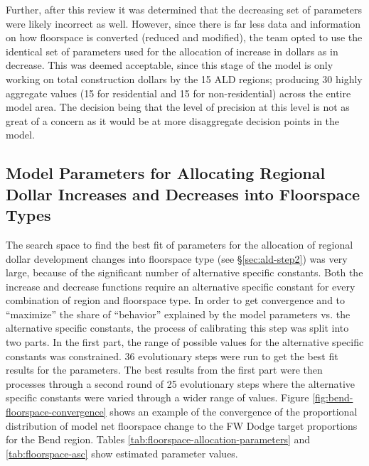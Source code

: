 Further, after this review it was determined that the decreasing set of parameters were likely incorrect as well. However, since there is far less data and information on how floorspace is converted (reduced and modified), the team opted to use the identical set of parameters used for the allocation of increase in dollars as in decrease. This was deemed acceptable, since this stage of the model is only working on total construction dollars by the 15 ALD regions; producing 30 highly aggregate values (15 for residential and 15 for non-residential) across the entire model area. The decision being that the level of precision at this level is not as great of a concern as it would be at more disaggregate decision points in the model.
  

\subsection{Model Parameters for Allocating Regional Dollar Increases and Decreases into Floorspace Types}\label{sec:ald-allocate-inc-dec}   %
The search space to find the best fit of parameters for the allocation of regional dollar development changes into floorspace type (see \S\ref{sec:ald-step2}) was very large, because of the significant number of alternative specific constants. Both the increase and decrease functions require an alternative specific constant for every combination of region and floorspace type. In order to get convergence and to ``maximize'' the share of ``behavior'' explained by the model parameters vs. the alternative specific constants, the process of calibrating this step was split into two parts. In the first part, the range of possible values for the alternative specific constants was constrained. 36 evolutionary steps were run to get the best fit results for the parameters. The best results from the first part were then processes through a second round of 25 evolutionary steps where the alternative specific constants were varied through a wider range of values. Figure \ref{fig:bend-floorspace-convergence} shows an example of the convergence of the proportional distribution of model net floorspace change to the FW Dodge target proportions for the Bend region. Tables \ref{tab:floorspace-allocation-parameters} and \ref{tab:floorspace-asc} show estimated parameter values.

